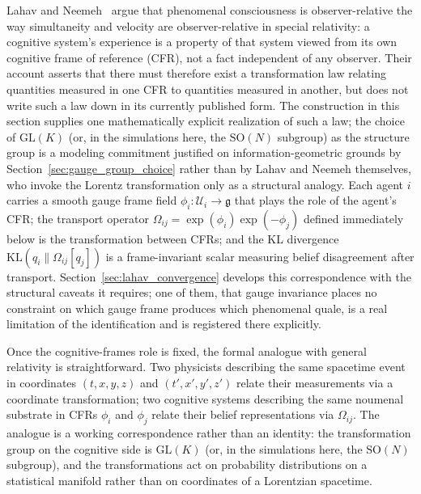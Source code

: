 \documentclass[11pt]{article}
\begin{document}
Lahav and Neemeh~\cite{LahavNeemeh2022, LahavNeemeh2025} argue that phenomenal consciousness is observer-relative the way simultaneity and velocity are observer-relative in special relativity: a cognitive system's experience is a property of that system viewed from its own cognitive frame of reference (CFR), not a fact independent of any observer. Their account asserts that there must therefore exist a transformation law relating quantities measured in one CFR to quantities measured in another, but does not write such a law down in its currently published form. The construction in this section supplies one mathematically explicit realization of such a law; the choice of $\mathrm{GL}(K)$ (or, in the simulations here, the $\mathrm{SO}(N)$ subgroup) as the structure group is a modeling commitment justified on information-geometric grounds by Section~\ref{sec:gauge_group_choice} rather than by Lahav and Neemeh themselves, who invoke the Lorentz transformation only as a structural analogy. Each agent $i$ carries a smooth gauge frame field $\phi_i: \mathcal{U}_i \to \mathfrak{g}$ that plays the role of the agent's CFR; the transport operator $\Omega_{ij} = \exp(\phi_i)\exp(-\phi_j)$ defined immediately below is the transformation between CFRs; and the KL divergence $\mathrm{KL}(q_i \| \Omega_{ij}[q_j])$ is a frame-invariant scalar measuring belief disagreement after transport. Section~\ref{sec:lahav_convergence} develops this correspondence with the structural caveats it requires; one of them, that gauge invariance places no constraint on which gauge frame produces which phenomenal quale, is a real limitation of the identification and is registered there explicitly.

Once the cognitive-frames role is fixed, the formal analogue with general relativity is straightforward. Two physicists describing the same spacetime event in coordinates $(t, x, y, z)$ and $(t', x', y', z')$ relate their measurements via a coordinate transformation; two cognitive systems describing the same noumenal substrate in CFRs $\phi_i$ and $\phi_j$ relate their belief representations via $\Omega_{ij}$. The analogue is a working correspondence rather than an identity: the transformation group on the cognitive side is $\mathrm{GL}(K)$ (or, in the simulations here, the $\mathrm{SO}(N)$ subgroup), and the transformations act on probability distributions on a statistical manifold rather than on coordinates of a Lorentzian spacetime.
\end{document}
